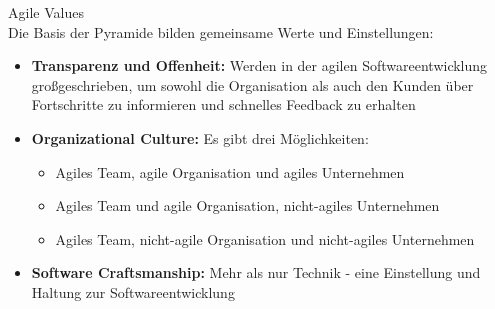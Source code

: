 \begin{concept}{Agile Values}\\
    Die Basis der Pyramide bilden gemeinsame Werte und Einstellungen:
    \begin{itemize}
        \item \textbf{Transparenz und Offenheit:} Werden in der agilen Softwareentwicklung großgeschrieben, um sowohl die Organisation als auch den Kunden über Fortschritte zu informieren und schnelles Feedback zu erhalten
        
        \item \textbf{Organizational Culture:} Es gibt drei Möglichkeiten:
        \begin{itemize}
            \item Agiles Team, agile Organisation und agiles Unternehmen
            \item Agiles Team und agile Organisation, nicht-agiles Unternehmen
            \item Agiles Team, nicht-agile Organisation und nicht-agiles Unternehmen
        \end{itemize}
        
        \item \textbf{Software Craftsmanship:} Mehr als nur Technik - eine Einstellung und Haltung zur Softwareentwicklung
    \end{itemize}
\end{concept}

